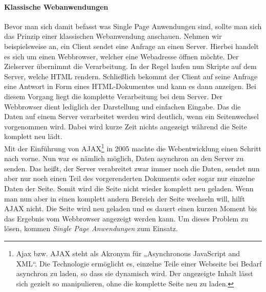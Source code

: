 \paragraph{Klassische Webanwendungen}
%
Bevor man sich damit befasst was Single Page Anwendungen sind, sollte man sich das Prinzip einer klassischen Webanwendung anschauen. Nehmen wir beispielsweise an, ein Client sendet eine Anfrage an einen Server. Hierbei handelt es sich um einen Webbrowser, welcher eine Webadresse öffnen möchte. Der Zielserver übernimmt die Verarbeitung. In der Regel laufen nun Skripte auf dem Server, welche HTML rendern. Schließlich bekommt der Client auf seine Anfrage eine Antwort in Form eines HTML-Dokumentes und kann es dann anzeigen. Bei diesem Vorgang liegt die komplette Verarbeitung bei dem Server. Der Webbrowser dient lediglich der Darstellung und einfachen Eingabe. Das die Daten auf einem Server verarbeitet werden wird deutlich, wenn ein Seitenwechsel vorgenommen wird. Dabei wird kurze Zeit nichts angezeigt während die Seite komplett neu lädt.\\
Mit der Einführung von AJAX\footnote{Ajax bzw. AJAX steht als Akronym für „Asynchronous JavaScript and XML“. Die Technologie ermöglicht es, einzelne Teile einer Webseite bei Bedarf asynchron zu laden, so dass sie dynamisch wird. Der angezeigte Inhalt lässt sich gezielt so manipulieren, ohne die komplette Seite neu zu laden.} in 2005 machte die Webentwicklung einen Schritt nach vorne. Nun war es nämlich möglich, Daten asynchron an den Server zu senden. Das heißt, der Server verabreitet zwar immer noch die Daten, sendet nun aber nur noch einen Teil des vorgerenderten Dokuments oder sogar nur einzelne Daten der Seite. Somit wird die Seite nicht wieder komplett neu geladen. Wenn man nun aber in einen komplett andern Bereich der Seite wechseln will, hilft AJAX nicht. Die Seite wird neu geladen und es dauert einen kurzen Moment bis das Ergebnis vom Webbrowser angezeigt werden kann. Um dieses Problem zu lösen, kommen \textit{Single Page Anwendungen} zum Einsatz.
